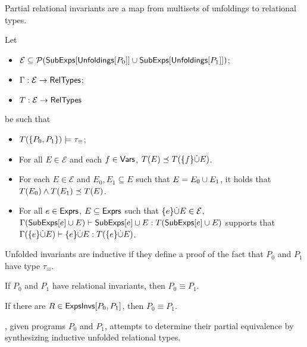 Partial relational invariants are a map from multisets of unfoldings
to relational types.
%
\begin{defn}
  \label{defn:inferred-invs}
  Let
  \begin{itemize}
  \item 
    $\mathcal{E} \subseteq \mathcal{P}(\mathsf{SubExps}[  \mathsf{Unfoldings}[ P_0 ]  ] \cup
      \mathsf{SubExps}[ \mathsf{Unfoldings}[ P_1 ]  ])$;
  \item
    $\Gamma : \mathcal{E} \to \mathsf{RelTypes}$;
  \item
    $T : \mathcal{E} \to \mathsf{RelTypes}$
  \end{itemize}
  be such that 
  \begin{itemize}
  \item 
    $T( \{  P_0, P_1  \} ) \models \tau_{ \equiv }$; 
  \item 
    For all $E \in \mathcal{E}$ and each $f \in \mathsf{Vars}$, $T(E) \preceq
    T(\{  f  \} \dot{\cup}  E)$.
  \item 
    For each $E \in \mathcal{E}$ and $E_0, E_1 \subseteq E$ such that
    $E = E_0 \cup E_1$, it holds that $T(E_0) \land T(E_1) \preceq
    T(E)$.
  \item 
    For all $e \in \mathsf{Exprs}$, $E \subseteq \mathsf{Exprs}$ such that
    $\{ e \} \dot{\cup} E \in \mathcal{E}$, $\Gamma(\mathsf{SubExps}[ e ] \cup E)
    \vdash \mathsf{SubExps}[  e  ] \cup E : T( \mathsf{SubExps}[ e ] \cup E)$
    supports that $\Gamma(\{ e \} \dot{\cup} E) \vdash \{ e \} \dot{\cup} E :
    T(\{ e \} \dot{\cup} E)$.
  \end{itemize}
\end{defn}
%
%

Unfolded invariants are inductive if they define a proof of the fact
that $P_0$ and $P_1$ have type $\tau_{\equiv}$.
% 
\begin{defn}
  \label{defn:ind-unfolded}
\end{defn}

If $P_0$ and $P_1$ have relational invariants, then $P_0 \equiv P_1$.
%
\begin{lemma}
  \label{lemma:equiv-evidence}
  If there are $R \in \mathsf{ExpsInvs}[ P_0, P_1 ]$, then $P_0 \equiv P_1$.
\end{lemma}
%
\sys, given programs $P_0$ and $P_1$, attempts to determine their
partial equivalence by synthesizing inductive unfolded relational
types.

